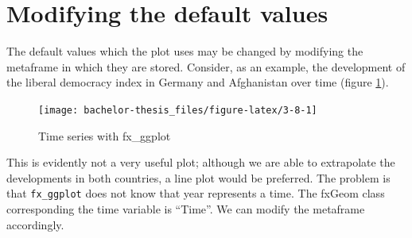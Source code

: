 \documentclass[]{report}
\newenvironment{Shaded}{\begin{snugshade}}{\end{snugshade}}
\newcommand{\KeywordTok}[1]{\textcolor[rgb]{0.13,0.29,0.53}{\textbf{#1}}}
\newcommand{\DataTypeTok}[1]{\textcolor[rgb]{0.13,0.29,0.53}{#1}}
\newcommand{\StringTok}[1]{\textcolor[rgb]{0.31,0.60,0.02}{#1}}
\newcommand{\OperatorTok}[1]{\textcolor[rgb]{0.81,0.36,0.00}{\textbf{#1}}}
\newcommand{\NormalTok}[1]{#1}
\theoremstyle{definition}
\theoremstyle{definition}
\theoremstyle{definition}
\theoremstyle{remark}
\begin{document}
\section{Modifying the default
values}\label{modifying-the-default-values}

The default values which the plot uses may be changed by modifying the
metaframe in which they are stored. Consider, as an example, the
development of the liberal democracy index in Germany and Afghanistan
over time (figure \ref{fig:3-8}).

\begin{Shaded}
\end{Shaded}

\begin{figure}

{\centering \texttt{[image: bachelor-thesis\_files/figure-latex/3-8-1]} 

}

\caption{Time series with fx\_ggplot}\label{fig:3-8}
\end{figure}



This is evidently not a very useful plot; although we are able to
extrapolate the developments in both countries, a line plot would be
preferred. The problem is that \texttt{fx\_ggplot} does not know that
year represents a time. The fxGeom class corresponding the time variable
is ``Time''. We can modify the metaframe accordingly.
\end{document}
